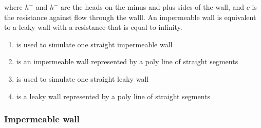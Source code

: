 \documentclass[letterpaper,10pt,english]{sphinxmanual}
\begin{document}
where \(h^-\) and \(h^-\) are the heads on the minus and plus sides of the wall, and \(c\) is the resistance against flow
through the walll. An impermeable wall is equivalent to a leaky wall with a resistance that is equal to infinity.
\begin{enumerate}
\item {} 
{\hyperref[\detokenize{linedoublets/implinedoublet:timml.linedoublet.ImpLineDoublet}]{}} is used to simulate one straight impermeable wall

\item {} 
{\hyperref[\detokenize{linedoublets/implinedoubletstring:timml.linedoublet.ImpLineDoubletString}]{}} is an impermeable wall represented by a poly line of straight segments

\item {} 
{\hyperref[\detokenize{linedoublets/leakylinedoublet:timml.linedoublet.LeakyLineDoublet}]{}} is used to simulate one straight leaky wall

\item {} 
{\hyperref[\detokenize{linedoublets/leakylinedoubletstring:timml.linedoublet.LeakyLineDoubletString}]{}} is a leaky wall represented by a poly line of straight segments

\end{enumerate}


\subsubsection{Impermeable wall}
\label{\detokenize{linedoublets/implinedoublet:impermeable-wall}}\label{\detokenize{linedoublets/implinedoublet::doc}}
\end{document}
